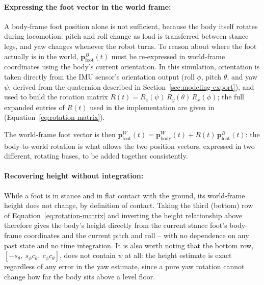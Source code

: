 \documentclass[12pt]{article}
\begin{document}
\paragraph{Expressing the foot vector in the world frame:} A body-frame foot position alone is not sufficient, because the body itself rotates during locomotion: pitch and roll change as load is transferred between stance legs, and yaw changes whenever the robot turns. To reason about where the foot actually is in the world, $\mathbf{p}^{B}_{\text{foot}}(t)$ must be re-expressed in world-frame coordinates using the body's current orientation. In this simulation, orientation is taken directly from the IMU sensor's orientation output (roll $\phi$, pitch $\theta$, and yaw $\psi$, derived from the quaternion described in Section~\ref{sec:modeling-export}), and used to build the rotation matrix $R(t) = R_z(\psi)\,R_y(\theta)\,R_x(\phi)$; the full expanded entries of $R(t)$ used in the implementation are given in  (Equation~\ref{eq:rotation-matrix}).

The world-frame foot vector is then $\mathbf{p}^{W}_{\text{foot}}(t) = \mathbf{p}^{W}_{\text{body}}(t) + R(t)\,\mathbf{p}^{B}_{\text{foot}}(t)$: the body-to-world rotation is what allows the two position vectors, expressed in two different, rotating bases, to be added together consistently.

\paragraph{Recovering height without integration:} While a foot is in stance and in flat contact with the ground, its world-frame height does not change, by definition of contact. Taking the third (bottom) row of Equation~\eqref{eq:rotation-matrix} and inverting the height relationship above therefore gives the body's height directly from the current stance foot's body-frame coordinates and the current pitch and roll -- with no dependence on any past state and no time integration. It is also worth noting that the bottom row, $[-s_\theta,\ s_\phi c_\theta,\ c_\phi c_\theta]$, does not contain $\psi$ at all: the height estimate is exact regardless of any error in the yaw estimate, since a pure yaw rotation cannot change how far the body sits above a level floor.
\end{document}
